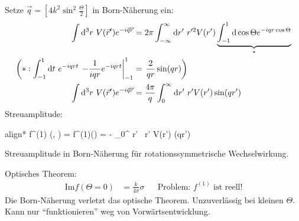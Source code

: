 	Setze $\vec{q} = \left[ 4 k^2 \sin^2 \frac{\Theta}{2} 
	\right]$ in Born-Näherung ein:
		\begin{align*}
			\int \mathrm{d}^3 r ~V(\vec{r}') e^{-i \vec{q} \vec{r}}
			&= 2 \pi \int_{-\infty}^{\infty} \mathrm{d} r' 
			~r'^2 V(r') 
			\underbrace{\int_{-1}^1 \mathrm{d} \cos \Theta 
			e^{-iqr \cos \Theta}}_{\substack{*}} \\
			\left(
			*: \int_{-1}^1 \mathrm{d} t ~e^{-iqr t} \right.
			\left. 
				- \frac{1}{iqr} e^{-iqrt}
			\right|_{-1}^1
			&= 
				\left. \frac{2}{qr} \sin (qr)
			\right) \\
			\int \mathrm{d}^3 r ~V(\vec{r}') e^{-i \vec{q} \vec{r}}
			&= \frac{4 \pi}{q} \int_{0}^{\infty}
			\mathrm{d} r' ~r' V(r') \sin (qr')
		\end{align*}
	Streuamplitude: 
		\begin{empheq}[box=\boxed]{align*}
			f^{(1)} (\Theta, \phi) = f^{(1)}(\Theta)
			= -  
			\int_0^{\infty} \diff r' ~r' V(r') \sin (qr')
		\end{empheq}
	Streuamplitude in Born-Näherung für rotationssymmetrische Wechselwirkung.
	
	Optisches Theorem:
		\begin{align*}
			\mathrm{Im} f(\Theta = 0) &= \frac{k}{4 \pi} \sigma
			& &\text{Problem: } f^{(1)} \text{ ist reell!}
		\end{align*}
	Die Born-Näherung verletzt das optische Theorem.
	Unzuverlässig bei kleinen $\Theta$. Kann nur ``funktionieren'' weg von Vorwärtsentwicklung.
	
